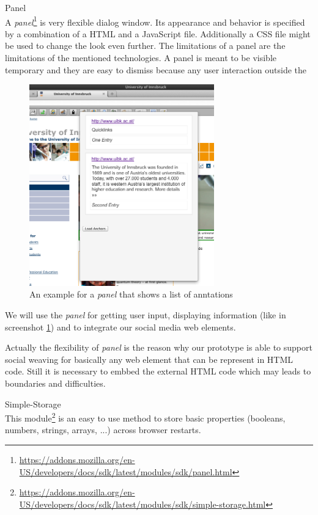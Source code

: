\begin{description}
\item Panel\\
A \emph{panel}\footnote{\url{https://addons.mozilla.org/en-US/developers/docs/sdk/latest/modules/sdk/panel.html}} is very flexible dialog window. Its appearance and behavior is specified by a combination of a HTML and a JavaScript file. Additionally a CSS file might be used to change the look even further. The limitations of a panel are the limitations of the mentioned technologies. 
A panel is meant to be visible temporary and they are easy to dismiss because any user interaction outside the 

\begin{figure}\centering
		\includegraphics[width=8cm]{images/example-panel.png}
		\caption{An example for a \emph{panel} that shows a list of anntations}
		\label{example-panel}
\end{figure} 

We will use the \emph{panel} for getting user input, displaying information (like in screenshot \ref{example-panel}) and to integrate our social media web elements. 

Actually the flexibility of \emph{panel} is the reason why our prototype is able to support social weaving for basically any web element that can be represent in HTML code. Still it is necessary to embbed the external HTML code which may leads to boundaries and difficulties.

\item Simple-Storage\\
This module\footnote{\url{https://addons.mozilla.org/en-US/developers/docs/sdk/latest/modules/sdk/simple-storage.html}} is an easy to use method to store basic properties (booleans, numbers, strings, arrays, ...) across browser restarts. 


\end{description}
